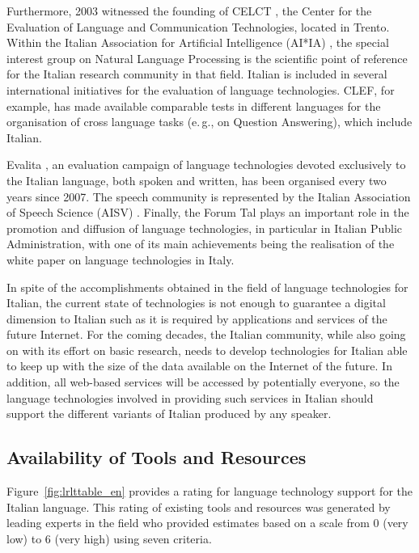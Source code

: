 \begin{multicols}{2}
Furthermore, 2003 witnessed the founding of CELCT \cite{celct}, the Center for the Evaluation of Language and Communication Technologies, located in Trento. Within the Italian Association for Artificial Intelligence (AI*IA) \cite{aixia}, the special interest group on Natural Language Processing is the scientific point of reference for the Italian research community in that field. Italian is included in several international initiatives for the evaluation of language technologies. CLEF, for example, has made available comparable tests in different languages for the organisation of cross language tasks (e.\,g., on Question Answering), which include Italian.

Evalita \cite{evalita}, an evaluation campaign of language technologies devoted exclusively to the Italian language, both spoken and written, has been organised every two years since 2007. The speech community is represented by the Italian Association of Speech Science (AISV) \cite{aisv}. Finally, the Forum Tal \cite{forumtal} plays an important role in the promotion and diffusion of language technologies, in particular in Italian Public Administration, with one of its main achievements being the realisation of the white paper on language technologies in Italy.

In spite of the accomplishments obtained in the field of language technologies for Italian, the current state of technologies is not enough to guarantee a digital dimension to Italian such as it is required by applications and services of the future Internet. For the coming decades, the Italian community, while also going on with its effort on basic research, needs to develop technologies for Italian able to keep up with the size of the data available on the Internet of the future. In addition, all web-based services will be accessed by potentially everyone, so the language technologies involved in providing such services in Italian should support the different variants of Italian produced by any speaker.
 
\subsection{Availability of Tools and Resources}

Figure~\ref{fig:lrlttable_en} provides a rating for language technology support for the Italian language. This rating of existing tools and resources was generated by leading experts in the field who provided estimates based on a scale from 0 (very low) to 6 (very high) using seven criteria.


\end{multicols}
